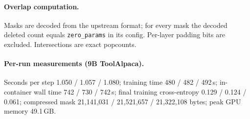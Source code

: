 \documentclass[11pt]{article}
\begin{document}
\paragraph{Overlap computation.} Masks are decoded from the upstream format; for every mask the decoded deleted count equals \texttt{zero\_params} in its config. Per-layer padding bits are excluded. Intersections are exact popcounts.

\paragraph{Per-run measurements (9B ToolAlpaca).} Seconds per step 1.050 / 1.057 / 1.080; training time 480 / 482 / 492\,s; in-container wall time 742 / 730 / 742\,s; final training cross-entropy 0.129 / 0.124 / 0.061; compressed mask 21,141,031 / 21,521,657 / 21,322,108 bytes; peak GPU memory 49.1\,GB.
\end{document}
